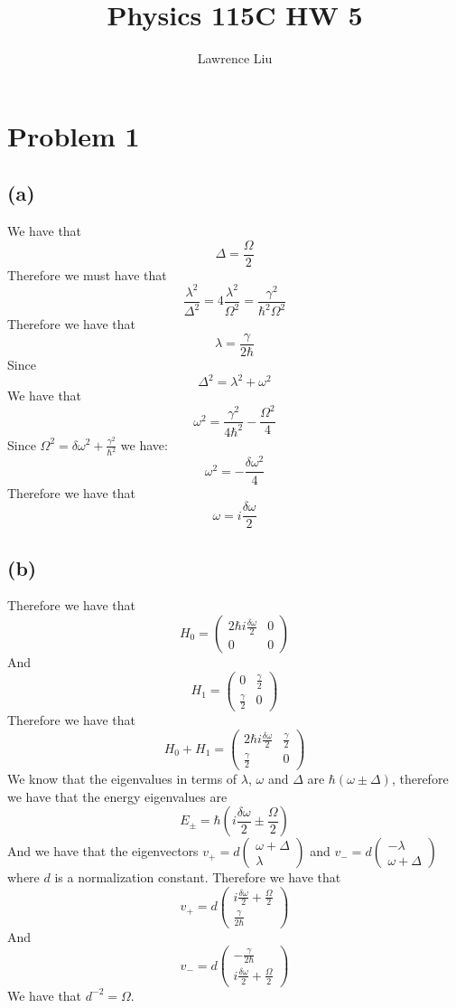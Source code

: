 \documentclass[11pt]{article}
\author{Lawrence Liu}
\title{Physics 115C HW 5}
\begin{document}
\maketitle
\section*{Problem 1}
\subsection*{(a)}
We have that 
$$\Delta=\frac{\Omega}{2}$$
Therefore we must have that 
$$\frac{\lambda^2}{\Delta^2}=4\frac{\lambda^2}{\Omega^2}=\frac{\gamma^2}{\hbar^2\Omega^2}$$
Therefore we have that 
$$\lambda = \frac{\gamma}{2\hbar}$$
Since 
$$\Delta^2=\lambda^2+\omega^2$$
We have that 
$$\omega^2=\frac{\gamma^2}{4\hbar^2}-\frac{\Omega^2}{4}$$
Since $\Omega^2 = \delta\omega^2+\frac{\gamma^2}{\hbar^2}$ we have:
$$\omega^2=-\frac{\delta\omega^2}{4}$$
Therefore we have that
$$\omega = i\frac{\delta\omega}{2}$$
\subsection*{(b)}
Therefore we have that 
$$H_0=\begin{pmatrix}
    2\hbar i\frac{\delta\omega}{2} & 0\\
    0 & 0
\end{pmatrix}$$
And 
$$H_1=\begin{pmatrix}
    0 & \frac{\gamma}{2}\\
    \frac{\gamma}{2} & 0
\end{pmatrix}$$
Therefore we have that 
$$H_0+H_1 = \begin{pmatrix}
    2\hbar i\frac{\delta\omega}{2}& \frac{\gamma}{2}\\
    \frac{\gamma}{2} & 0
\end{pmatrix}$$
We know that the eigenvalues in terms of $\lambda$, $\omega$ and $\Delta$
are $\hbar(\omega\pm\Delta)$, therefore we have that the energy eigenvalues are 
$$E_{\pm} = \hbar \left(i\frac{\delta\omega}{2}\pm \frac{\Omega}{2}\right)$$
And we have that the eigenvectors $v_{+}= d\begin{pmatrix}
    \omega+\Delta\\
    \lambda
\end{pmatrix}$ and $v_{-}= d\begin{pmatrix}
    -\lambda\\
    \omega+\Delta
\end{pmatrix}$ where $d$ is a normalization constant. Therefore we have that
$$v_{+}=d\begin{pmatrix}
    i\frac{\delta\omega}{2}+\frac{\Omega}{2}\\
    \frac{\gamma}{2\hbar}
\end{pmatrix}$$
And
$$v_{-}=d\begin{pmatrix}
    -\frac{\gamma}{2\hbar}\\
    i\frac{\delta\omega}{2}+\frac{\Omega}{2}
\end{pmatrix}$$
We have that $d^{-2} = \Omega$.
\end{document}
